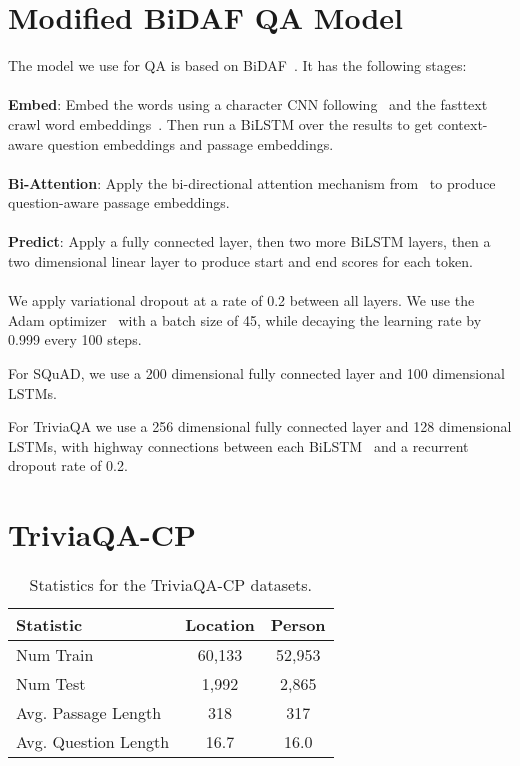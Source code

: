 \documentclass[11pt,a4paper]{article}
\begin{document}
\section{Modified BiDAF QA Model}
\label{appendix:bidaf-model}
The model we use for QA is based on BiDAF~\cite{seo2016bidirectional}. It has the following stages:
\\
\\
\noindent
\textbf{Embed}: Embed the words using a character CNN following~\citet{seo2016bidirectional} and the fasttext crawl word embeddings~\cite{fasttext_word_vectors}. Then run a BiLSTM over the results to get context-aware question embeddings and passage embeddings.
\\
\\
\noindent
\textbf{Bi-Attention}: Apply the bi-directional attention mechanism from~\citet{seo2016bidirectional} to produce question-aware passage embeddings.
\\
\\
\noindent
\textbf{Predict}: Apply a fully connected layer, then two more BiLSTM layers, then a two dimensional linear layer to produce start and end scores for each token.
\\
\\
We apply variational dropout at a rate of 0.2 between all layers. We use the Adam optimizer~\cite{adam} with a batch size of 45, while decaying the learning rate by 0.999 every 100 steps.

For SQuAD, we use a 200 dimensional fully connected layer and 100 dimensional LSTMs.

For TriviaQA we use a 256 dimensional fully connected layer and 128 dimensional LSTMs, with highway connections between each BiLSTM~\cite{srivastava2015highway} and a recurrent dropout rate of 0.2.

\section{TriviaQA-CP}
\label{appendix:triviaqa_cp}
\begin{table}[]
    \centering
    \tablefont
\begin{tabular}{lcc} \toprule
Statistic & Location & Person\\ \midrule
Num Train & 60,133 & 52,953 \\ 
Num Test & 1,992 & 2,865 \\ 
Avg. Passage Length & 318 & 317 \\ 
Avg. Question Length & 16.7 & 16.0 \\ 
\bottomrule
\end{tabular}
    \caption{Statistics for the TriviaQA-CP datasets.}
    \label{tab:triviqa-stats}
\end{table}
\end{document}
